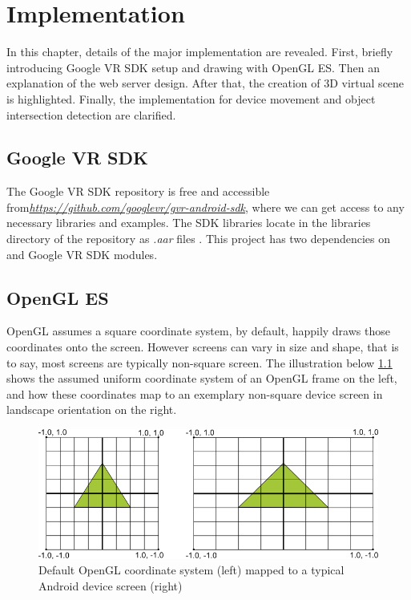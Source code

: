 \label{chapter-implementation}
\chapter{Implementation}

In this chapter, details of the major implementation are revealed. First, briefly introducing Google VR SDK setup and drawing with OpenGL ES. Then an explanation of the web server design. After that, the creation of 3D virtual scene is highlighted. Finally, the implementation for device movement and object intersection detection are  clarified.

\section{Google VR SDK}

The Google VR SDK repository is free and accessible from\href{https://github.com/googlevr/gvr-android-sdk}{\emph{https://github.com/googlevr/gvr-android-sdk}}, where we can get access to any necessary libraries and examples. The SDK libraries locate in the libraries directory of the repository as \emph{.aar} files \cite{google.aar-format.2016}. This project has two dependencies on  and  Google VR SDK modules.

\section{OpenGL ES}

OpenGL assumes a square coordinate system, by default, happily draws those coordinates onto the screen. However screens can vary in size and shape, that is to say, most screens are typically non-square screen. The illustration below \ref{fig:opengl-coordinates} shows the assumed uniform coordinate system of an OpenGL frame on the left, and how these coordinates map to an exemplary non-square device screen in landscape orientation on the right.

\begin{figure}[H]
\caption[OpenGL coordinate system mapping]{Default OpenGL coordinate system (left) mapped to a typical Android device screen (right) \cite{google.opengles.2016}}
\label{fig:opengl-coordinates}
\centering
\includegraphics[width=\linewidth]{Figures/opengl-coordinates.png}
\decoRule
\end{figure}

